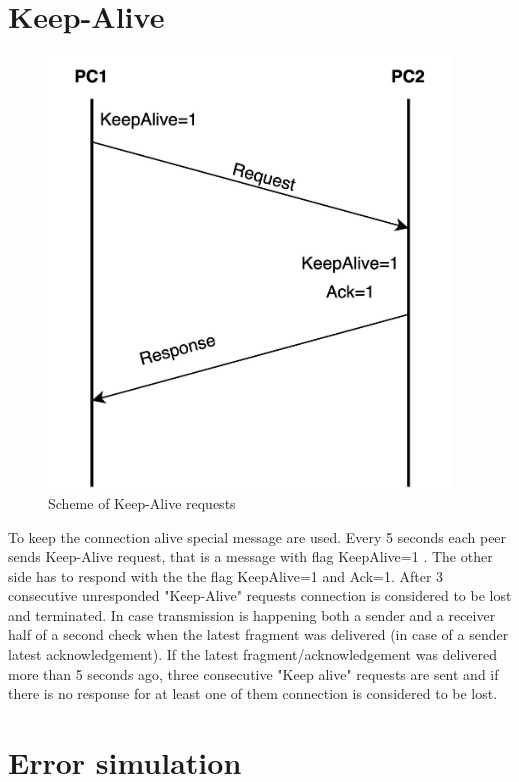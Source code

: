 \documentclass{article}
\begin{document}
\section{Keep-Alive}

\begin{figure}[h]
    \centering
    \includegraphics[width=0.95\textwidth]{images/keepalive.png}
    \caption{Scheme of Keep-Alive requests}
    \label{fig:mesh1}
\end{figure}
To keep the connection alive special message are used. Every 5 seconds each peer sends Keep-Alive request, that is a message with flag KeepAlive=1 . The other side has to respond with the the flag KeepAlive=1 and Ack=1. After 3 consecutive unresponded "Keep-Alive" requests connection is considered to be lost and terminated. In case transmission is happening both a sender and a receiver half of a second check when the latest fragment was delivered (in case of a sender latest acknowledgement). If the latest fragment/acknowledgement was delivered more than 5 seconds ago, three consecutive "Keep alive" requests are sent and if there is no response for at least one of them connection is considered to be lost.

\newpage

\section{Error simulation}
\end{document}
